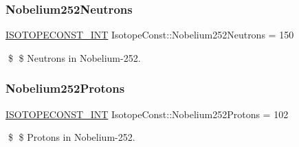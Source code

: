 \subsubsection{\texorpdfstring{Nobelium252\+Neutrons}{Nobelium252Neutrons}}
{\footnotesize\ttfamily \mbox{\hyperlink{group___isotope_const-_macros_ga5f18360b3e99483a35c32d789e62621c}{I\+S\+O\+T\+O\+P\+E\+C\+O\+N\+S\+T\+\_\+\+I\+NT}} Isotope\+Const\+::\+Nobelium252\+Neutrons = 150}

\$ \$ Neutrons in Nobelium-\/252. \mbox{\label{group___isotope_const-_nobelium-_no252_ga73631365b0c43696a09b5e6b1e7aaf0a}} 
\subsubsection{\texorpdfstring{Nobelium252\+Protons}{Nobelium252Protons}}
{\footnotesize\ttfamily \mbox{\hyperlink{group___isotope_const-_macros_ga5f18360b3e99483a35c32d789e62621c}{I\+S\+O\+T\+O\+P\+E\+C\+O\+N\+S\+T\+\_\+\+I\+NT}} Isotope\+Const\+::\+Nobelium252\+Protons = 102}

\$ \$ Protons in Nobelium-\/252. 